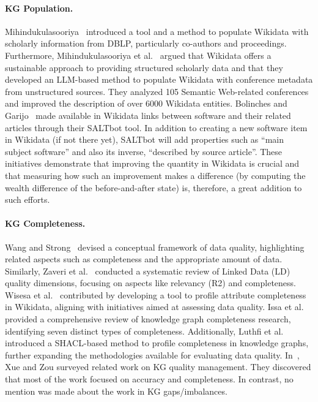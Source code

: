 \paragraph{KG Population.}
Mihindukulasooriya~\cite{Mihindukulasooriya24} introduced a tool and a method to populate Wikidata with scholarly information from DBLP, particularly co-authors and proceedings.
Furthermore, Mihindukulasooriya et al.~\cite{MihindukulasooriyaTDNCP24} argued that Wikidata offers a sustainable approach to providing structured scholarly data and that they developed an LLM-based method to populate Wikidata with conference metadata from unstructured sources.
They analyzed 105 Semantic Web-related conferences and improved the description of over 6000 Wikidata entities. Bolinches and Garijo~\cite{BolinchesG23} made available in Wikidata links between software and their related articles through their SALTbot tool. In addition to creating a new software item in Wikidata (if not there yet), SALTbot will add properties such as ``main subject software'' and also its inverse, ``described by source article''. These initiatives demonstrate that improving the quantity in Wikidata is crucial and that measuring how such an improvement makes a difference (by computing the wealth difference of the before-and-after state) is, therefore, a great addition to such efforts.

\paragraph{KG Completeness.} Wang and Strong~\cite{WangS96} devised a conceptual framework of data quality, highlighting related aspects such as completeness and the appropriate amount of data. Similarly, Zaveri et al.~\cite{ZaveriRMPLA16} conducted a systematic review of Linked Data (LD) quality dimensions, focusing on aspects like relevancy (R2) and completeness.
Wisesa et al.~\cite{WisesaDKNR19} contributed by developing a tool to profile attribute completeness in Wikidata, aligning with initiatives aimed at assessing data quality. Issa et al.~\cite{IssaAHCDZ21} provided a comprehensive review of knowledge graph completeness research, identifying seven distinct types of completeness.
Additionally, Luthfi et al.~\cite{LuthfiDA22} introduced a SHACL-based method to profile completeness in knowledge graphs, further expanding the methodologies available for evaluating data quality. In~\cite{XueZ23}, Xue and Zou surveyed related work on KG quality management. They discovered that most of the work focused on accuracy and completeness. In contrast, no mention was made about the work in KG gaps/imbalances.

